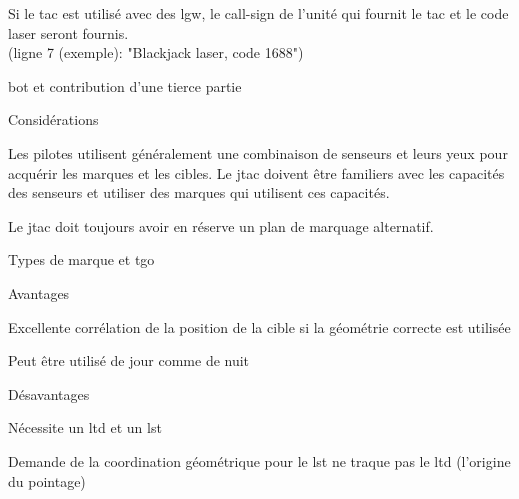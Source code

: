 \begin{e1}
\begin{e2}
{\begin{e3}
			\item Si le \gls{tac} est utilisé avec des \gls{lgw}, le call-sign de l'unité qui fournit le \gls{tac} et le code laser seront fournis.\\ (ligne 7 (exemple): "Blackjack laser, code 1688")
		\end{e3}}
		\item \gls{bot} et contribution d'une tierce partie
		\begin{e3}
\item Considérations
			\begin{e4}
				\item Les pilotes utilisent généralement une combinaison de senseurs et leurs yeux pour acquérir les marques et les cibles. Le \gls{jtac} doivent être familiers avec les capacités des senseurs et utiliser des marques qui utilisent ces capacités.
				\item Le \gls{jtac} doit toujours avoir en réserve un plan de marquage alternatif.
			\end{e4}
			\item Types de marque et \gls{tgo}
			\begin{e4}
				\begin{e5}
					\item Avantages
					\begin{e6}
						\item Excellente corrélation de la position de la cible si la géométrie correcte est utilisée
						\item Peut être utilisé de jour comme de nuit
					\end{e6}
					\item Désavantages
					\begin{e6}
							\item Nécessite un \gls{ltd} et un \gls{lst}
							\item Demande de la coordination géométrique pour le \gls{lst} ne traque pas le \gls{ltd} (l'origine du pointage)

\end{e6}
\end{e5}
\end{e4}
\end{e3}
\end{e2}
\end{e1}
